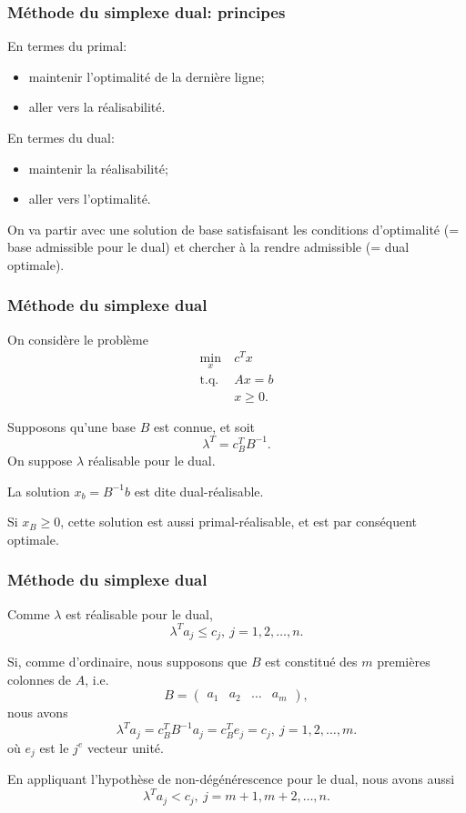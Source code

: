 \documentclass[usepdftitle=false]{beamer}
\begin{document}
\begin{frame}
\frametitle{Méthode du simplexe dual: principes}

En termes du primal:
\begin{itemize}
\item
maintenir l'optimalité de la dernière ligne;
\item
aller vers la réalisabilité.
\end{itemize}

\mbox{}

En termes du dual:
\begin{itemize}
\item
maintenir la réalisabilité;
\item
aller vers l'optimalité.
\end{itemize}

\mbox{}

On va partir avec une solution de base satisfaisant les conditions d’optimalité (= base admissible pour le dual) et chercher à la rendre admissible (= dual optimale).

\end{frame}

\begin{frame}
\frametitle{Méthode du simplexe dual}

On considère le problème
\begin{align*}
\min_x \ & c^Tx \\
\mbox{t.q. } & Ax = b\\
& x \geq 0.
\end{align*}

Supposons qu'une base $B$ est connue, et soit
\[
\lambda^T = c_B^T B^{-1}.
\]
On suppose $\lambda$ réalisable pour le dual.

\mbox{}

La solution $x_b = B^{-1}b$ est dite \mbox{dual-réalisable}.

\mbox{}

Si $x_B \geq 0$, cette solution est aussi primal-réalisable, et est par conséquent optimale.

\end{frame}

\begin{frame}
\frametitle{Méthode du simplexe dual}

Comme $\lambda$ est réalisable pour le dual,
\[
\lambda^T a_j \leq c_j,\ j = 1, 2, \ldots, n.
\]

\mbox{}

Si, comme d'ordinaire, nous supposons que $B$ est constitué des $m$ premières colonnes de $A$, i.e.
\[
B = \begin{pmatrix}
a_1 & a_2 & \ldots & a_m
\end{pmatrix},
\]
nous avons
\[
\lambda^T a_j = c_B^T B^{-1} a_j = c_B^T e_j = c_j,\ j = 1, 2, \ldots, m.
\]
où $e_j$ est le $j^e$ vecteur unité.

\mbox{}

En appliquant l'hypothèse de non-dégénérescence pour le dual, nous avons aussi
\[
\lambda^T a_j < c_j,\ j = m+1, m+2, \ldots, n.
\]

\end{frame}
\end{document}
